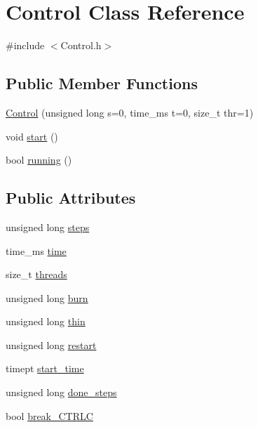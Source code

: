 \hypertarget{struct_control}{}\section{Control Class Reference}
\label{struct_control}


{\ttfamily \#include $<$Control.\+h$>$}

\subsection*{Public Member Functions}
\begin{DoxyCompactItemize}
\item 
\hyperlink{struct_control_af442f77287fcc4f90d245ceaa5b0276f}{Control} (unsigned long s=0, time\+\_\+ms t=0, size\+\_\+t thr=1)
\item 
void \hyperlink{struct_control_a933994a3524f2f6d7ef0a17086e7cf66}{start} ()
\item 
bool \hyperlink{struct_control_a9217475a8ad619e7360524ae49c559a7}{running} ()
\end{DoxyCompactItemize}
\subsection*{Public Attributes}
\begin{DoxyCompactItemize}
\item 
unsigned long \hyperlink{struct_control_af4bd5a6c779079b5e921b4df40760266}{steps}
\item 
time\+\_\+ms \hyperlink{struct_control_a273f3488d567bb10871e71245a406f3e}{time}
\item 
size\+\_\+t \hyperlink{struct_control_af130110f07dc3bced4d8d0fafac5b755}{threads}
\item 
unsigned long \hyperlink{struct_control_acb1e669784385d64b9f840674a3e08c1}{burn}
\item 
unsigned long \hyperlink{struct_control_a08030350e86fd21411599690892e31a8}{thin}
\item 
unsigned long \hyperlink{struct_control_acd75b8aa48fdb33f063bae7469a9721b}{restart}
\item 
timept \hyperlink{struct_control_ad3c2691a66705880844f467cf5da8aab}{start\+\_\+time}
\item 
unsigned long \hyperlink{struct_control_a4a1867401c3e89aecaf14949521ed247}{done\+\_\+steps}
\item 
bool \hyperlink{struct_control_a3a1856c582efd2a6a1b8f40351038d0c}{break\+\_\+\+C\+T\+R\+LC}
\end{DoxyCompactItemize}


